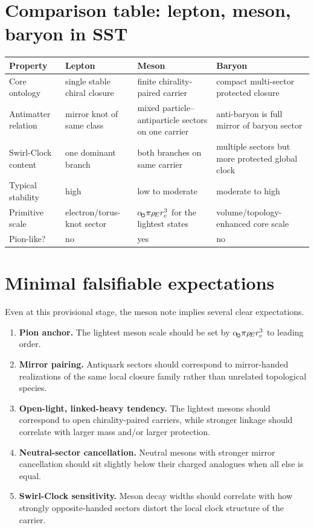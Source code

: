 \documentclass[11pt,a4paper]{article}
\newcommand{\swirlarrow}{\mathchoice{\mkern-2mu\scriptstyle\boldsymbol{\circlearrowleft}}{\mkern-2mu\scriptstyle\boldsymbol{\circlearrowleft}}{\mkern-2mu\scriptscriptstyle\boldsymbol{\circlearrowleft}}{\mkern-2mu\scriptscriptstyle\boldsymbol{\circlearrowleft}}}
\newcommand{\rhoE}{\rho_{\!E}}
\newcommand{\rc}{r_c}
\newcommand{\alphasw}{\alpha_{\!\swirlarrow}}
\begin{document}
\section{Comparison table: lepton, meson, baryon in SST}
\begin{center}
\begin{tabular}{>{\raggedright\arraybackslash}p{} >{\raggedright\arraybackslash}p{} >{\raggedright\arraybackslash}p{} >{\raggedright\arraybackslash}p{}}
\toprule
Property & Lepton & Meson & Baryon \\
\midrule
Core ontology & single stable chiral closure & finite chirality-paired carrier & compact multi-sector protected closure \\
Antimatter relation & mirror knot of same class & mixed particle--antiparticle sectors on one carrier & anti-baryon is full mirror of baryon sector \\
Swirl-Clock content & one dominant branch & both branches on same carrier & multiple sectors but more protected global clock \\
Typical stability & high & low to moderate & moderate to high \\
Primitive scale & electron/torus-knot sector & \(\alphasw\pi\rhoE\rc^{3}\) for the lightest states & volume/topology-enhanced core scale \\
Pion-like? & no & yes & no \\
\bottomrule
\end{tabular}
\end{center}

\section{Minimal falsifiable expectations}
Even at this provisional stage, the meson note implies several clear expectations.
\begin{enumerate}[label=(P\arabic*)]
    \item \textbf{Pion anchor.} The lightest meson scale should be set by \(\alphasw\pi\rhoE\rc^{3}\) to leading order.
    \item \textbf{Mirror pairing.} Antiquark sectors should correspond to mirror-handed realizations of the same local closure family rather than unrelated topological species.
    \item \textbf{Open-light, linked-heavy tendency.} The lightest mesons should correspond to open chirality-paired carriers, while stronger linkage should correlate with larger mass and/or larger protection.
    \item \textbf{Neutral-sector cancellation.} Neutral mesons with stronger mirror cancellation should sit slightly below their charged analogues when all else is equal.
    \item \textbf{Swirl-Clock sensitivity.} Meson decay widths should correlate with how strongly opposite-handed sectors distort the local clock structure of the carrier.
\end{enumerate}
\end{document}
